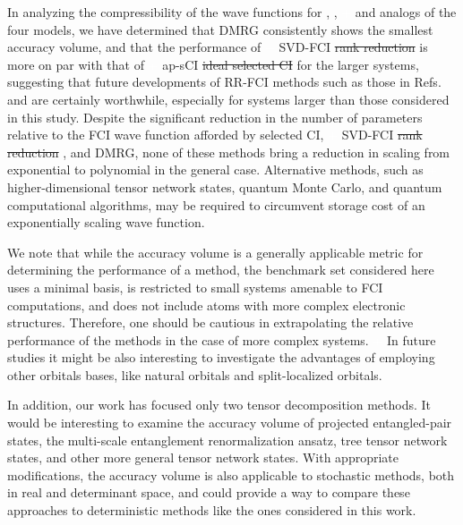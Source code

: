 \documentclass[aip,jcp,amsmath,amssymb, preprint]{revtex4-1}
\newcommand{\add}[1]{\colorbox{goodgreen}{\textcolor{white}{\footnotesize  \fontfamily{phv}\selectfont +}}
    \textcolor{goodgreen}{{#1}}\xspace}
\newcommand{\addnew}[1]{\colorbox{goodorange}{\textcolor{white}{\footnotesize  \fontfamily{phv}\selectfont +}}
\textcolor{goodorange}{{#1}}\xspace
}
\newcommand{\remove}[1]{
\colorbox{goodred}{\textcolor{white}{\footnotesize  \fontfamily{phv}\selectfont \textminus\vphantom{c}}}
\textcolor{goodred}{\sout{#1}}\xspace
}
\begin{document}
In analyzing the compressibility of the wave functions for , , \add{and } analogs of the four  models, we have determined that DMRG consistently shows the smallest accuracy volume, and that the performance of \add{SVD-FCI} \remove{rank reduction} is more on par with that of \add{ap-sCI} \remove{ideal selected CI} for the larger systems, suggesting that future developments of RR-FCI methods such as those in Refs.  and  are certainly worthwhile, especially for systems larger than those considered in this study. 
Despite the significant reduction in the number of parameters relative to the FCI wave function afforded by selected CI, \add{SVD-FCI} \remove{rank reduction}, and DMRG, none of these methods bring a reduction in scaling from exponential to polynomial in the general case.
Alternative methods, such as \addnew{higher-dimensional tensor network states, quantum Monte Carlo, and} quantum computational algorithms, may be required to circumvent storage cost of an exponentially scaling wave function.

We note that while the accuracy volume is a generally applicable metric for determining the performance of a method, the benchmark set considered here uses a minimal basis, is restricted to small systems amenable to FCI computations, and does not include atoms with more complex electronic structures.
Therefore, one should be cautious in extrapolating the relative performance of the methods in the case of more complex systems.
\addnew{In future studies it might be also interesting to investigate the advantages of employing other orbitals bases, like natural orbitals and split-localized orbitals.}
In addition, our work has focused only two tensor decomposition methods.
It would be interesting to examine the accuracy volume of projected entangled-pair states,\cite{verstraete2004renormalization} the multi-scale entanglement renormalization ansatz,\cite{vidal2007entanglement} tree tensor network states,\cite{Murg2010SimulatingStrongly, Nakatani2013EfficientTree, murg2015tree} and other more general tensor network states.
With appropriate modifications, the accuracy volume is also applicable to stochastic methods,\cite{needs2009continuum, motta2018ab} both in real and determinant space, and could provide a way to compare these approaches to deterministic methods like the ones considered in this work.
\end{document}
